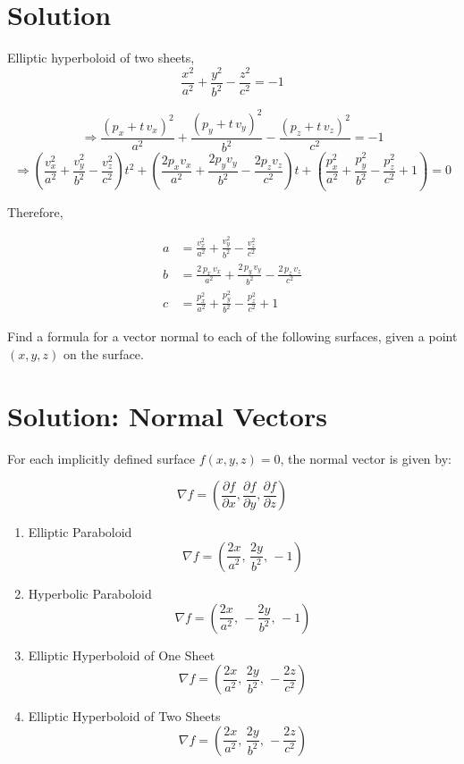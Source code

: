 \documentclass{article}
\begin{document}
\begin{enumerate}
\section*{Solution}

Elliptic hyperboloid of two sheets,
    \[ \frac{x^2}{a^2} + \frac{y^2}{b^2} - \frac{z^2}{c^2} = -1\]

    \[
\Rightarrow\frac{(p_x + t\,v_x)^2}{a^2} + \frac{(p_y + t\,v_y)^2}{b^2} - \frac{(p_z + t\,v_z)^2}{c^2} = -1
\]
\[
\Rightarrow \left( \frac{v_x^2}{a^2} + \frac{v_y^2}{b^2} - \frac{v_z^2}{c^2} \right)t^2 + \left( \frac{2 p_x v_x}{a^2} + \frac{2 p_y v_y}{b^2} - \frac{2 p_z v_z}{c^2} \right)t + \left( \frac{p_x^2}{a^2} + \frac{p_y^2}{b^2} - \frac{p_z^2}{c^2} + 1 \right) = 0
\]

Therefore,

\[
\boxed{
\begin{aligned}
a &= \frac{v_x^2}{a^2} + \frac{v_y^2}{b^2} - \frac{v_z^2}{c^2}\\[1mm]
b &= \frac{2\,p_x\,v_x}{a^2} + \frac{2\,p_y\,v_y}{b^2} - \frac{2\,p_z\,v_z}{c^2}\\[1mm]
c &= \frac{p_x^2}{a^2} + \frac{p_y^2}{b^2} - \frac{p_z^2}{c^2} + 1
\end{aligned}
}
\]

\newpage

Find a formula for a vector normal to each of the following
  surfaces, given a point $(x,y,z)$ on the surface.
  \section*{Solution: Normal Vectors}

For each implicitly defined surface \( f(x, y, z) = 0 \), the normal vector is given by:

\[
\nabla f = \left( \frac{\partial f}{\partial x}, \frac{\partial f}{\partial y}, \frac{\partial f}{\partial z} \right)
\]

\begin{enumerate}
    \item Elliptic Paraboloid
   \[
\boxed{\nabla f = \left(\frac{2x}{a^2},\, \frac{2y}{b^2},\, -1\right)}
\]

    \item Hyperbolic Paraboloid
    \[
\boxed{\nabla f = \left(\frac{2x}{a^2},\, -\frac{2y}{b^2},\, -1\right)}
\]

    \item Elliptic Hyperboloid of One Sheet
    \[
\boxed{\nabla f = \left(\frac{2x}{a^2},\, \frac{2y}{b^2},\, -\frac{2z}{c^2}\right)}
\]

    \item Elliptic Hyperboloid of Two Sheets
   \[
\boxed{\nabla f = \left(\frac{2x}{a^2},\, \frac{2y}{b^2},\, -\frac{2z}{c^2}\right)}
\]
\end{enumerate}

\end{enumerate}
\end{document}
